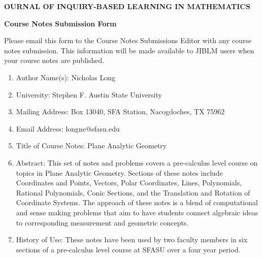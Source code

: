 \documentclass[12pt]{article}
\begin{document}
\begin{center}
{\bf {}OURNAL OF {\Large I}NQUIRY-{\Large B}ASED
{\Large L}EARNING
\medskip
\noindent IN {\Large M}ATHEMATICS}
\end{center}

\medskip
\begin{center}
{\large \bf Course Notes Submission Form}
\end{center}

Please email this form to the Course Notes Submissions Editor with any course notes submission. This information will be made available to JIBLM users when your course notes are published.

\begin{enumerate}

\item Author Name(s): Nicholas Long

\item University: Stephen F. Austin State University

\item Mailing Address: Box 13040, SFA Station, Nacogdoches, TX 75962

\item Email Address: longne@sfasu.edu

\item Title of Course Notes: Plane Analytic Geometry

\item Abstract: This set of notes and problems covers a pre-calculus level course on topics in Plane Analytic Geometry. Sections of these notes include Coordinates and Points, Vectors, Polar Coordinates, Lines, Polynomials, Rational Polynomials, Conic Sections, and the Translation and Rotation of Coordinate Systems. The approach of these notes is a blend of computational and sense making problems that aim to have students connect algebraic ideas to corresponding measurement and geometric concepts.

\item History of Use: These notes have been used by two faculty members in six sections of a pre-calculus level course at SFASU over a four year period.
\end{enumerate}
\end{document}
